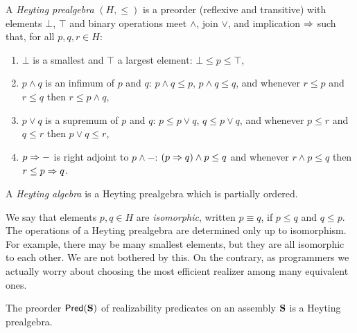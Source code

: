 \begin{definition}
  A \emph{Heyting prealgebra} $(H, {\leq})$ is a preorder (reflexive
  and transitive) with elements $\bot$, $\top$ and binary operations
  meet $\land$, join $\lor$, and implication $\Rightarrow$ such that, for all
  $p, q, r \in H$:
  \begin{enumerate}
  \item $\bot$ is a smallest and $\top$ a largest element: $\bot \leq
    p \leq \top$,
  \item $p \land q$ is an infimum of $p$ and $q$: $p \land q \leq p$,
    $p \land q \leq q$, and whenever $r \leq p$ and $r \leq q$ then $r
    \leq p \land q$,
  \item $p \lor q$ is a supremum of $p$ and $q$: $p \leq p \lor q$, $q
    \leq p \lor q$, and whenever $p \leq r$ and $q \leq r$ then $p
    \lor q \leq r$,
  \item $p \Rightarrow {-}$ is right adjoint to $p \land {-}$: $(p \Rightarrow q)
    \land p \leq q$ and whenever $r \land p \leq q$ then $r \leq p
    \Rightarrow q$.
  \end{enumerate}
  A \emph{Heyting algebra} is a Heyting prealgebra which is partially
  ordered.
\end{definition}

We say that elements $p, q \in H$ are \emph{isomorphic}, written $p
\equiv q$, if $p \leq q$ and $q \leq p$. The operations of a Heyting
prealgebra are determined only up to isomorphism. For example, there
may be many smallest elements, but they are all isomorphic to each
other. We are not bothered by this. On the contrary, as programmers we
actually worry about choosing the most efficient realizer among many
equivalent ones.

\begin{proposition}
  The preorder $\mathsf{Pred}(\mathbf{S})$ of realizability predicates on an
  assembly $\mathbf{S}$ is a Heyting prealgebra.
\end{proposition}

